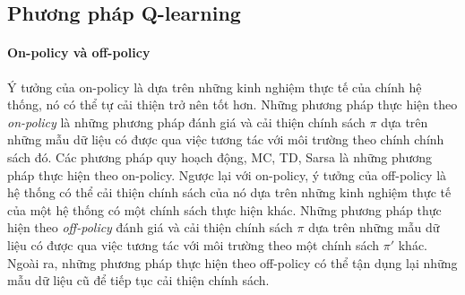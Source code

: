 \subsection{Phương pháp Q-learning}
\paragraph*{On-policy và off-policy}
Ý tưởng của on-policy là dựa trên những kinh nghiệm thực tế của chính hệ thống, nó có thể tự cải thiện trở nên tốt hơn. Những phương pháp thực hiện theo \textit{on-policy} là những phương pháp đánh giá và cải thiện chính sách $\pi$ dựa trên những mẫu dữ liệu có được qua việc tương tác với môi trường theo chính chính sách đó. Các phương pháp quy hoạch động, MC, TD, Sarsa là những phương pháp thực hiện theo on-policy.
Ngược lại với on-policy, ý tưởng của off-policy là hệ thống có thể cải thiện chính sách của nó dựa trên những kinh nghiệm thực tế của một hệ thống có một chính sách thực hiện khác. Những phương pháp thực hiện theo \textit{off-policy} đánh giá và cải thiện chính sách $\pi$ dựa trên những mẫu dữ liệu có được qua việc tương tác với môi trường theo một chính sách $\pi'$ khác. Ngoài ra, những phương pháp thực hiện theo off-policy có thể tận dụng lại những mẫu dữ liệu cũ để tiếp tục cải thiện chính sách.

